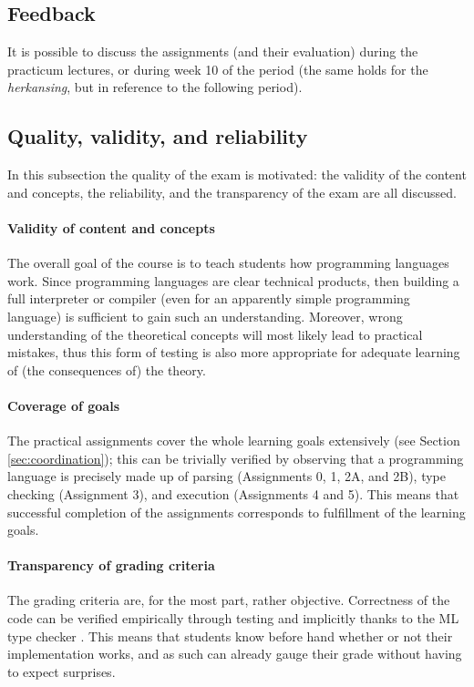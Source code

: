 \documentclass[a4paper, 10pt]{article}
\begin{document}
	\subsection{Feedback}
		It is possible to discuss the assignments (and their evaluation) during the practicum lectures, or during week 10 of the period (the same holds for the \textit{herkansing}, but in reference to the following period).

	\subsection{Quality, validity, and reliability}
		In this subsection the quality of the exam is motivated: the validity of the content and concepts, the reliability, and the transparency of the exam are all discussed.

		\paragraph*{Validity of content and concepts}
			The overall goal of the course is to teach students how programming languages work. Since programming languages are clear technical products, then building a full interpreter or compiler (even for an apparently simple programming language) is sufficient to gain such an understanding. Moreover, wrong understanding of the theoretical concepts will most likely lead to practical mistakes, thus this form of testing is also more appropriate for adequate learning of (the consequences of) the theory.  \\
		
		\paragraph*{Coverage of goals}
			The practical assignments cover the whole learning goals extensively (see Section \ref{sec:coordination}); this can be trivially verified by observing that a programming language is precisely made up of parsing (Assignments 0, 1, 2A, and 2B), type checking (Assignment 3), and execution (Assignments 4 and 5). This means that successful completion of the assignments corresponds to fulfillment of the learning goals. \\

		\paragraph*{Transparency of grading criteria}
			The grading criteria are, for the most part, rather objective. Correctness of the code can be verified empirically through testing \cite{testing} and implicitly thanks to the ML type checker \cite{TAPL}. This means that students know before hand whether or not their implementation works, and as such can already gauge their grade without having to expect surprises.
\end{document}
